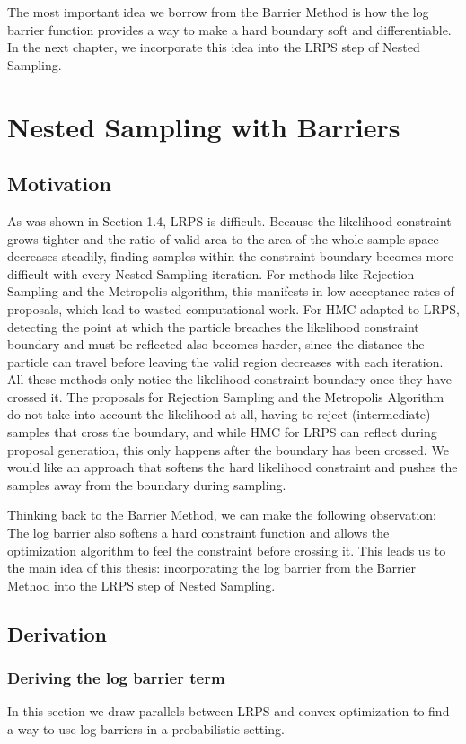 \documentclass[12pt, a4paper]{report}
\begin{document}
The most important idea we borrow from the Barrier Method is how the log barrier function provides a way to make a hard boundary soft and differentiable.
In the next chapter, we incorporate this idea into the LRPS step of Nested Sampling.


\chapter{Nested Sampling with Barriers}

\section{Motivation}
As was shown in Section 1.4, LRPS is difficult.
Because the likelihood constraint grows tighter and the ratio of valid area to the area of the whole sample space decreases steadily, finding samples within the constraint boundary becomes more difficult with every Nested Sampling iteration.
For methods like Rejection Sampling and the Metropolis algorithm, this manifests in low acceptance rates of proposals, which lead to wasted computational work.
For HMC adapted to LRPS, detecting the point at which the particle breaches the likelihood constraint boundary and must be reflected also becomes harder, since the distance the particle can travel before leaving the valid region decreases with each iteration.
All these methods only notice the likelihood constraint boundary once they have crossed it.
The proposals for Rejection Sampling and the Metropolis Algorithm do not take into account the likelihood at all, having to reject (intermediate) samples that cross the boundary, and while HMC for LRPS can reflect during proposal generation, this only happens after the boundary has been crossed.
We would like an approach that softens the hard likelihood constraint and pushes the samples away from the boundary during sampling.

Thinking back to the Barrier Method, we can make the following observation:
The log barrier also softens a hard constraint function and allows the optimization algorithm to feel the constraint before crossing it.
This leads us to the main idea of this thesis: incorporating the log barrier from the Barrier Method into the LRPS step of Nested Sampling.

\section{Derivation}
\subsection{Deriving the log barrier term}
In this section we draw parallels between LRPS and convex optimization to find a way to use log barriers in a probabilistic setting.
\end{document}
